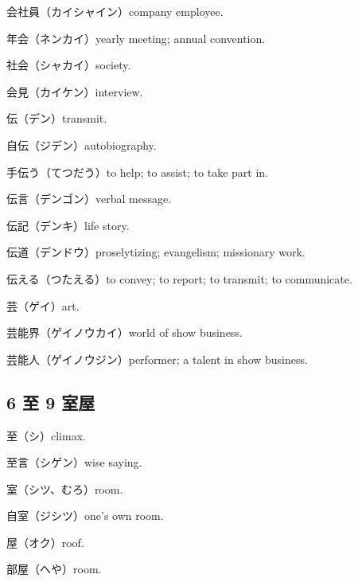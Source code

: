 会社員（カイシャイン）company employee.

年会（ネンカイ）yearly meeting; annual convention.

社会（シャカイ）society.

会見（カイケン）interview.

伝（デン）transmit.

自伝（ジデン）autobiography.

手伝う（てつだう）to help; to assist; to take part in.

伝言（デンゴン）verbal message.

伝記（デンキ）life story.

伝道（デンドウ）proselytizing; evangelism; missionary work.

伝える（つたえる）to convey; to report; to transmit; to communicate.

芸（ゲイ）art.

芸能界（ゲイノウカイ）world of show business.

芸能人（ゲイノウジン）performer; a talent in show business.

\subsection{6 至 9 室屋}

至（シ）climax.

至言（シゲン）wise saying.

室（シツ、むろ）room.

自室（ジシツ）one's own room.

屋（オク）roof.

部屋（へや）room.
